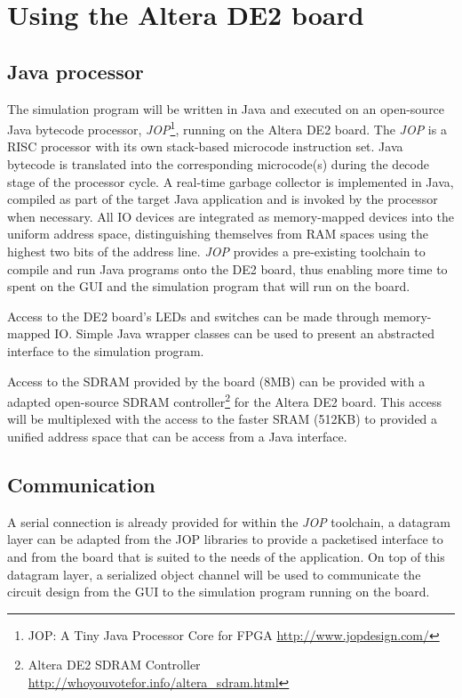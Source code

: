 \documentclass[12pt, a4paper, oneside,titlepage]{article}
\begin{document}
\section{Using the Altera DE2 board}
\subsection{Java processor}
The simulation program will be written in Java and executed on an open-source Java bytecode processor, \emph{JOP}\footnote{JOP: A Tiny Java Processor Core for FPGA \url{http://www.jopdesign.com/}}, running on the Altera DE2 board. The \emph{JOP} is a RISC processor with its own stack-based microcode instruction set. Java bytecode is translated into the corresponding microcode(s) during the decode stage of the processor cycle. A real-time garbage collector is implemented in Java, compiled as part of the target Java application and is invoked by the processor when necessary. All IO devices are integrated as memory-mapped devices into the uniform address space, distinguishing themselves from RAM spaces using the highest two bits of the address line. \emph{JOP} provides a pre-existing toolchain to compile and run Java programs onto the DE2 board, thus enabling more time to spent on the GUI and the simulation program that will run on the board. 

Access to the DE2 board's LEDs and switches can be made through memory-mapped IO. Simple Java wrapper classes can be used to present an abstracted interface to the simulation program. 

Access to the SDRAM provided by the board (8MB) can be provided with a adapted open-source SDRAM controller\footnote{Altera DE2 SDRAM Controller \url{http://whoyouvotefor.info/altera_sdram.html}} for the Altera DE2 board. This access will be multiplexed with the access to the faster SRAM (512KB) to provided a unified address space that can be access from a Java interface. 

\subsection{Communication}
A serial connection is already provided for within the \emph{JOP} toolchain, a datagram layer can be adapted from the JOP libraries to provide a packetised interface to and from the board that is suited to the needs of the application. On top of this datagram layer, a serialized object channel will be used to communicate the circuit design from the GUI to the simulation program running on the board. 
\end{document}

